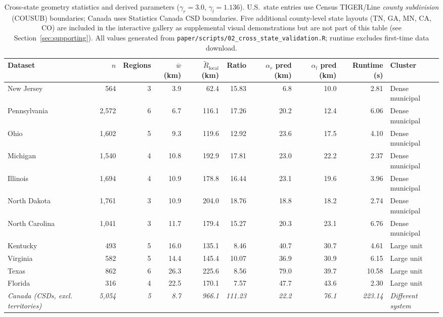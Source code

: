 \documentclass[12pt, a4paper]{article}
\numberwithin{equation}{section}
\begin{document}
\begin{table}[h]
\centering
\caption{Cross-state geometry statistics and derived parameters ($\gamma_r = 3.0$, $\gamma_l = 1.136$). U.S.\ state entries use Census TIGER/Line \emph{county subdivision} (COUSUB) boundaries; Canada uses Statistics Canada CSD boundaries. Five additional county-level state layouts (TN, GA, MN, CA, CO) are included in the interactive gallery as supplemental visual demonstrations but are not part of this table (see Section~\ref{sec:supporting}). All values generated from \texttt{paper/scripts/02\_cross\_state\_validation.R}; runtime excludes first-time data download.}
\label{tab:crossstate}
\begin{adjustbox}{max width=\textwidth}
\begin{tabular}{lrrrrrrrrl}
\toprule
\textbf{Dataset} & \textbf{$n$} & \textbf{Regions} & \textbf{$\bar{w}$ (km)} & \textbf{$\widetilde{R}_{\text{local}}$ (km)} & \textbf{Ratio} & \textbf{$\alpha_r$ pred (km)} & \textbf{$\alpha_l$ pred (km)} & \textbf{Runtime (s)} & \textbf{Cluster} \\
\midrule
New Jersey   & 564     & 3 & 3.9  & 62.4  & 15.83 & 6.8  & 10.0  & 2.81 & Dense municipal \\
Pennsylvania & 2{,}572 & 6 & 6.7  & 116.1 & 17.26 & 20.2 & 12.4  & 6.06 & Dense municipal \\
Ohio         & 1{,}602 & 5 & 9.3  & 119.6 & 12.92 & 23.6 & 17.5  & 4.10 & Dense municipal \\
Michigan     & 1{,}540 & 4 & 10.8 & 192.9 & 17.81 & 23.0 & 22.2  & 2.37 & Dense municipal \\
Illinois     & 1{,}694 & 4 & 10.9 & 178.8 & 16.44 & 23.1 & 19.6  & 3.96 & Dense municipal \\
North Dakota & 1{,}761 & 3 & 10.9 & 204.0 & 18.76 & 18.8 & 18.2  & 2.74 & Dense municipal \\
North Carolina & 1{,}041 & 3 & 11.7 & 179.4 & 15.27 & 20.3 & 23.1 & 6.76 & Dense municipal \\
\midrule
Kentucky     & 493     & 5 & 16.0 & 135.1 & 8.46  & 40.7 & 30.7  & 4.61 & Large unit \\
Virginia     & 582     & 5 & 14.4 & 145.4 & 10.07 & 36.9 & 30.9  & 6.15 & Large unit \\
Texas        & 862     & 6 & 26.3 & 225.6 & 8.56  & 79.0 & 39.7  & 10.58 & Large unit \\
Florida      & 316     & 4 & 22.5 & 170.1 & 7.57  & 47.7 & 43.6  & 2.30 & Large unit \\
\midrule
\textit{Canada (CSDs, excl. territories)} & \textit{5{,}054} & \textit{5} & \textit{8.7} & \textit{966.1} & \textit{111.23} & \textit{22.2} & \textit{76.1} & \textit{223.14} & \textit{Different system} \\
\bottomrule
\end{tabular}
\end{adjustbox}
\end{table}
\end{document}
